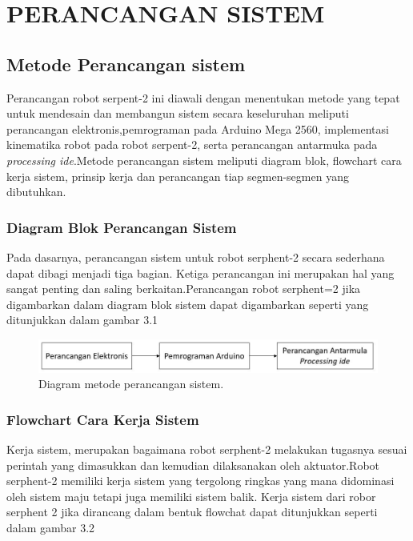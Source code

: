 
\chapter{PERANCANGAN SISTEM}

\section{Metode Perancangan sistem}
Perancangan robot serpent-2 ini diawali dengan menentukan metode yang tepat untuk mendesain dan membangun sistem secara keseluruhan meliputi perancangan elektronis,pemrograman pada Arduino Mega 2560, implementasi kinematika robot pada robot serpent-2, serta perancangan antarmuka pada \emph {processing ide}.Metode perancangan sistem meliputi diagram blok, flowchart cara kerja sistem, prinsip kerja dan perancangan tiap segmen-segmen yang dibutuhkan.
	
	\subsection{Diagram Blok Perancangan Sistem}
	Pada dasarnya, perancangan sistem untuk robot serphent-2 secara sederhana dapat dibagi menjadi tiga bagian. Ketiga perancangan ini merupakan hal yang sangat penting dan saling berkaitan.Perancangan robot serphent=2 jika digambarkan dalam diagram blok sistem dapat digambarkan seperti yang ditunjukkan dalam gambar 3.1
	\begin{figure}[H]
		\centering
		\includegraphics[width=\linewidth]{gambar/diagram_blok.jpg}
		\caption{Diagram metode perancangan sistem.}
	\end{figure}

\subsection{Flowchart Cara Kerja Sistem}
Kerja sistem, merupakan bagaimana robot serphent-2 melakukan tugasnya sesuai perintah yang dimasukkan dan kemudian dilaksanakan oleh aktuator.Robot serphent-2 memiliki kerja sistem yang tergolong ringkas yang mana didominasi oleh sistem maju tetapi juga memiliki sistem balik.  Kerja sistem dari robor serphent 2 jika dirancang dalam bentuk flowchat dapat ditunjukkan seperti dalam gambar 3.2

